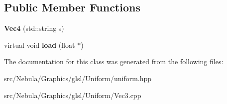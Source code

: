 \subsection*{\-Public \-Member \-Functions}
\begin{DoxyCompactItemize}
\item 
\hypertarget{classNeb_1_1glsl_1_1Uniform_1_1Scalar_1_1Vec4_a1e9c061fa7bf37160ecaa5cbb147ddcb}{{\bfseries \-Vec4} (std\-::string s)}\label{classNeb_1_1glsl_1_1Uniform_1_1Scalar_1_1Vec4_a1e9c061fa7bf37160ecaa5cbb147ddcb}

\item 
\hypertarget{classNeb_1_1glsl_1_1Uniform_1_1Scalar_1_1Vec4_ac789b262241f8e23c42c79e4ea573cd1}{virtual void {\bfseries load} (float $\ast$)}\label{classNeb_1_1glsl_1_1Uniform_1_1Scalar_1_1Vec4_ac789b262241f8e23c42c79e4ea573cd1}

\end{DoxyCompactItemize}


\-The documentation for this class was generated from the following files\-:\begin{DoxyCompactItemize}
\item 
src/\-Nebula/\-Graphics/glsl/\-Uniform/uniform.\-hpp\item 
src/\-Nebula/\-Graphics/glsl/\-Uniform/\-Vec3.\-cpp\end{DoxyCompactItemize}
